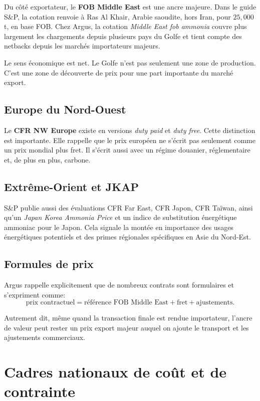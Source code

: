 \documentclass[11pt]{article}
\begin{document}
Du côté exportateur, le \textbf{FOB Middle East} est une ancre majeure. Dans le guide S\&P, la cotation renvoie à Ras Al Khair, Arabie saoudite, hors Iran, pour \(25{,}000\) t, en base FOB. Chez Argus, la cotation \emph{Middle East fob ammonia} couvre plus largement les chargements depuis plusieurs pays du Golfe et tient compte des netbacks depuis les marchés importateurs majeurs.

Le sens économique est net. Le Golfe n'est pas seulement une zone de production. C'est une zone de découverte de prix pour une part importante du marché export.

\subsection{Europe du Nord-Ouest}

Le \textbf{CFR NW Europe} existe en versions \emph{duty paid} et \emph{duty free}. Cette distinction est importante. Elle rappelle que le prix européen ne s'écrit pas seulement comme un prix mondial plus fret. Il s'écrit aussi avec un régime douanier, réglementaire et, de plus en plus, carbone.

\subsection{Extrême-Orient et JKAP}

S\&P publie aussi des évaluations CFR Far East, CFR Japon, CFR Taïwan, ainsi qu'un \emph{Japan Korea Ammonia Price} et un indice de substitution énergétique ammoniac pour le Japon. Cela signale la montée en importance des usages énergétiques potentiels et des primes régionales spécifiques en Asie du Nord-Est.

\subsection{Formules de prix}

Argus rappelle explicitement que de nombreux contrats sont formulaires et s'expriment comme:
\[
\text{prix contractuel} = \text{référence FOB Middle East} + \text{fret} + \text{ajustements}.
\]

Autrement dit, même quand la transaction finale est rendue importateur, l'ancre de valeur peut rester un prix export majeur auquel on ajoute le transport et les ajustements commerciaux.

\section{Cadres nationaux de coût et de contrainte}
\end{document}
